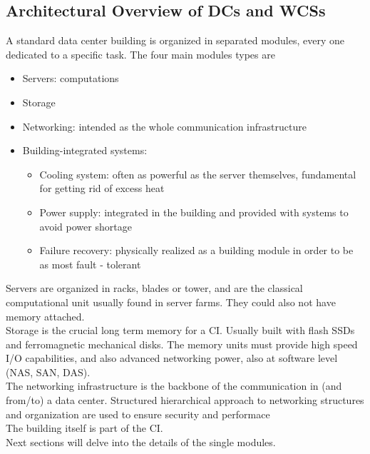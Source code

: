 \documentclass[10pt,a4paper]{article}
\begin{document}
			\subsection{Architectural Overview of DCs and WCSs}
				A standard data center building is organized in separated modules, every one dedicated to a specific task. The four main modules types are
				\begin{itemize}
					\item Servers: computations
					\item Storage
					\item Networking: intended as the whole communication infrastructure
					\item Building-integrated systems:
						\begin{itemize}
							\item Cooling system: often as powerful as the server themselves, fundamental for getting rid of excess heat
							\item Power supply: integrated in the building and provided with systems to avoid power shortage
							\item Failure recovery: physically realized as a building module in order to be as most fault - tolerant
						\end{itemize}
				\end{itemize}
				Servers are organized in racks, blades or tower, and are the classical computational unit usually found in server farms. They could also not have memory attached.\\
				Storage is the crucial long term memory for a CI. Usually built with flash SSDs and ferromagnetic mechanical disks. The memory units must provide high speed I/O capabilities, and also advanced networking power, also at software level (NAS, SAN, DAS).\\
				The networking infrastructure is the backbone of the communication in (and from/to) a data center. Structured hierarchical approach to networking structures and organization are used to ensure security and performace\\
				The building itself is part of the CI.\\
				Next sections will delve into the details of the single modules.
			
\end{document}
